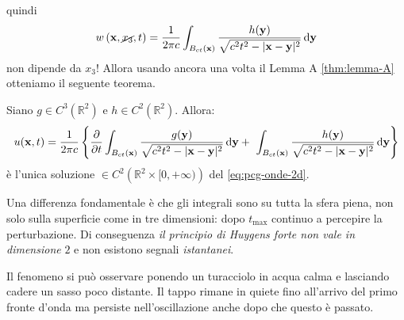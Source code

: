 \FloatBarrier
quindi
\begin{equation*}
    w\left(\mathbf{x} ,\cancel{x_{3}} ,t\right) =\frac{1}{2\pi c}\int _{B_{ct}(\mathbf{x})}\frac{h(\mathbf{y})}{\sqrt{c^{2} t^{2} -| \mathbf{x} -\mathbf{y}| ^{2}}} \,\mathrm d \mathbf{y}
\end{equation*}
non dipende da $\displaystyle x_{3}$! Allora usando ancora una volta il Lemma A \ref{thm:lemma-A} otteniamo il seguente teorema.
\begin{theorem}
     Siano $\displaystyle g\in C^{3}\left(\mathbb{R}^{2}\right)$ e $\displaystyle h\in C^{2}\left(\mathbb{R}^{2}\right)$. Allora:
    \begin{equation}
        u(\x ,t) =\frac{1}{2\pi c}\left\{\frac{\partial }{\partial t}\int _{B_{ct}(\x)}\frac{g(\y)}{\sqrt{c^{2} t^{2} -| \x -\y| ^{2}}} \dyy +\ \int _{B_{ct}(\x)}\frac{h(\y)}{\sqrt{c^{2} t^{2} -| \x -\y| ^{2}}} \dyy\right\}
    \end{equation}
    è l'unica soluzione $\displaystyle \in C^{2}\left(\mathbb{R}^{2} \times [ 0,+\infty)\right)$ del \eqref{eq:pcg-onde-2d}.
\end{theorem}
Una differenza fondamentale è che gli integrali sono su tutta la sfera piena, non solo sulla superficie come in tre dimensioni: dopo $\displaystyle t_{\max}$ continuo a percepire la perturbazione. Di conseguenza \textit{il principio di Huygens forte non vale in dimensione }$2$ e non esistono segnali \textit{istantanei}.

Il fenomeno si può osservare ponendo un turacciolo in acqua calma e lasciando cadere un sasso poco distante. Il tappo rimane in quiete fino all'arrivo del primo fronte d'onda ma persiste nell'oscillazione anche dopo che questo è passato.